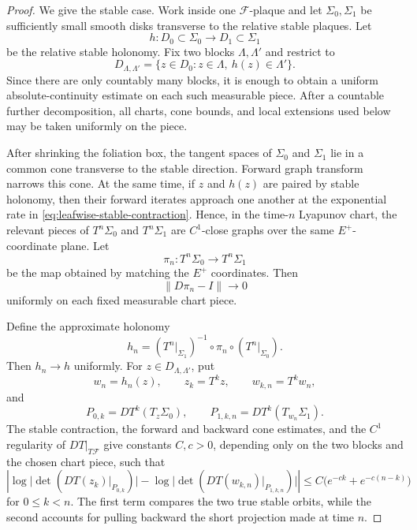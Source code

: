\documentclass[11pt]{amsart}
\numberwithin{equation}{section}
\theoremstyle{plain}
\begin{document}
\begin{proof}
We give the stable case.  Work inside one $\mathcal F$-plaque and let
$\Sigma_0,\Sigma_1$ be sufficiently small smooth disks transverse to the
relative stable plaques.  Let
\[
 h:D_0\subset\Sigma_0\longrightarrow D_1\subset\Sigma_1
\]
be the relative stable holonomy.  Fix two blocks $\Lambda,\Lambda'$ and
restrict to
\[
 D_{\Lambda,\Lambda'}
 =\{z\in D_0:z\in\Lambda,\ h(z)\in\Lambda'\}.
\]
Since there are only countably many blocks, it is enough to obtain a uniform
absolute-continuity estimate on each such measurable piece.  After a
countable further decomposition, all charts, cone bounds, and local
extensions used below may be taken uniformly on the piece.

After shrinking the foliation box, the tangent spaces of $\Sigma_0$ and
$\Sigma_1$ lie in a common cone transverse to the stable direction.  Forward
graph transform narrows this cone.  At the same time, if $z$ and $h(z)$ are
paired by stable holonomy, then their forward iterates approach one another
at the exponential rate in \eqref{eq:leafwise-stable-contraction}.  Hence,
in the time-$n$ Lyapunov chart, the relevant pieces of
$T^n\Sigma_0$ and $T^n\Sigma_1$ are $C^1$-close graphs over the same
$E^+$-coordinate plane.  Let
\[
 \pi_n:T^n\Sigma_0\longrightarrow T^n\Sigma_1
\]
be the map obtained by matching the $E^+$ coordinates.  Then
\[
 \|D\pi_n-I\|\longrightarrow0
\]
uniformly on each fixed measurable chart piece.

Define the approximate holonomy
\[
 h_n=(T^n|_{\Sigma_1})^{-1}\circ\pi_n\circ(T^n|_{\Sigma_0}).
\]
Then $h_n\to h$ uniformly.  For $z\in D_{\Lambda,\Lambda'}$, put
\[
 w_n=h_n(z),\qquad z_k=T^kz,\qquad w_{k,n}=T^kw_n,
\]
and
\[
 P_{0,k}=DT^k(T_z\Sigma_0),
 \qquad
 P_{1,k,n}=DT^k(T_{w_n}\Sigma_1).
\]
The stable contraction, the forward and backward cone estimates, and the
$C^1$ regularity of $DT|_{T\mathcal F}$ give constants $C,c>0$, depending
only on the two blocks and the chosen chart piece, such that
\begin{equation}\label{eq:leafwise-distortion}
 \left|
 \log\bigl|\det(DT(z_k)|_{P_{0,k}})\bigr|
 -
 \log\bigl|\det(DT(w_{k,n})|_{P_{1,k,n}})\bigr|
 \right|
 \le C\bigl(e^{-ck}+e^{-c(n-k)}\bigr)
\end{equation}
for $0\le k<n$.  The first term compares the two true stable orbits, while
the second accounts for pulling backward the short projection made at time
$n$.


\end{proof}
\end{document}
